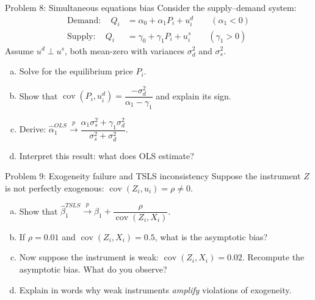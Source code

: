 \documentclass[10pt]{beamer}
\begin{document}
\begin{frame}{Problem 8: Simultaneous equations bias}
\label{q8}
Consider the supply--demand system:
\begin{align*}
\text{Demand}: \quad Q_i &= \alpha_0 + \alpha_1 P_i + u_i^d \qquad (\alpha_1 < 0) \\
\text{Supply}: \quad Q_i &= \gamma_0 + \gamma_1 P_i + u_i^s \qquad (\gamma_1 > 0)
\end{align*}
Assume $u^d \perp u^s$, both mean-zero with variances $\sigma_d^2$ and $\sigma_s^2$.

\begin{enumerate}[(a)]
  \item Solve for the equilibrium price $P_i$.
  \item Show that $\operatorname{cov}(P_i, u_i^d) = \dfrac{-\sigma_d^2}{\alpha_1 - \gamma_1}$ and explain its sign.
  \item Derive: $\widehat{\alpha}_1^{OLS} \xrightarrow{p} \dfrac{\alpha_1 \sigma_s^2 + \gamma_1 \sigma_d^2}{\sigma_s^2 + \sigma_d^2}$.
  \item Interpret this result: what does OLS estimate?
\end{enumerate}

\vfill
\hfill\hyperlink{s8}{}
\end{frame}

\begin{frame}{Problem 9: Exogeneity failure and TSLS inconsistency}
\label{q9}
Suppose the instrument $Z$ is not perfectly exogenous: $\operatorname{cov}(Z_i, u_i) = \rho \neq 0$.

\begin{enumerate}[(a)]
  \item Show that $\widehat{\beta}_1^{TSLS} \xrightarrow{p} \beta_1 + \dfrac{\rho}{\operatorname{cov}(Z_i, X_i)}$.
  \item If $\rho = 0.01$ and $\operatorname{cov}(Z_i, X_i) = 0.5$, what is the asymptotic bias?
  \item Now suppose the instrument is weak: $\operatorname{cov}(Z_i, X_i) = 0.02$. Recompute the asymptotic bias. What do you observe?
  \item Explain in words why weak instruments \emph{amplify} violations of exogeneity.
\end{enumerate}

\vfill
\hfill\hyperlink{s9}{}
\end{frame}
\end{document}
